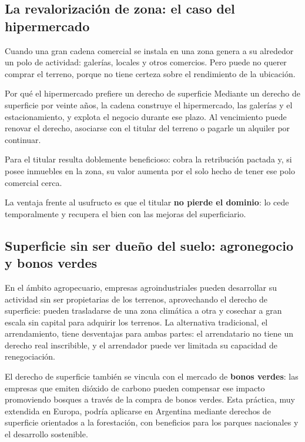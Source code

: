 \documentclass[12pt,oneside]{book}
\begin{document}
\subsection{La revalorización de zona: el caso del hipermercado}

Cuando una gran cadena comercial se instala en una zona genera a su alrededor un polo de actividad: galerías, locales y otros comercios. Pero puede no querer comprar el terreno, porque no tiene certeza sobre el rendimiento de la ubicación.

\begin{example}{Por qué el hipermercado prefiere un derecho de superficie}
Mediante un derecho de superficie por veinte años, la cadena construye el hipermercado, las galerías y el estacionamiento, y explota el negocio durante ese plazo. Al vencimiento puede renovar el derecho, asociarse con el titular del terreno o pagarle un alquiler por continuar.

Para el titular resulta doblemente beneficioso: cobra la retribución pactada y, si posee inmuebles en la zona, su valor aumenta por el solo hecho de tener ese polo comercial cerca.
\end{example}

La ventaja frente al usufructo es que el titular \textbf{no pierde el dominio}: lo cede temporalmente y recupera el bien con las mejoras del superficiario.

\subsection{Superficie sin ser dueño del suelo: agronegocio y bonos verdes}

En el ámbito agropecuario, empresas agroindustriales pueden desarrollar su actividad sin ser propietarias de los terrenos, aprovechando el derecho de superficie: pueden trasladarse de una zona climática a otra y cosechar a gran escala sin capital para adquirir los terrenos. La alternativa tradicional, el arrendamiento, tiene desventajas para ambas partes: el arrendatario no tiene un derecho real inscribible, y el arrendador puede ver limitada su capacidad de renegociación.

El derecho de superficie también se vincula con el mercado de \textbf{bonos verdes}: las empresas que emiten dióxido de carbono pueden compensar ese impacto promoviendo bosques a través de la compra de bonos verdes. Esta práctica, muy extendida en Europa, podría aplicarse en Argentina mediante derechos de superficie orientados a la forestación, con beneficios para los parques nacionales y el desarrollo sostenible.
\end{document}
